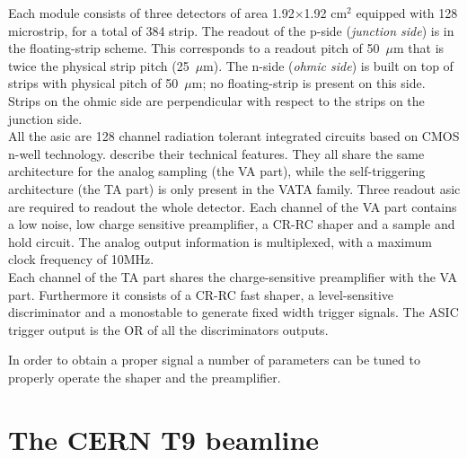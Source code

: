 Each module consists of three detectors of area 1.92$\times$1.92 cm$^2$
equipped with 128 microstrip, for a total of 384 strip. The readout of the
p-side ({\em junction side}) is in the floating-strip scheme. This corresponds
to a readout pitch of 50~$\mu$m that is twice the physical strip pitch
(25~$\mu$m). The n-side ({\em ohmic side}) is built on top of strips with physical pitch of
50~$\mu$m; no floating-strip is present on this side. Strips on the ohmic side
are perpendicular with respect to the strips on the junction side.\\

All the \gls{asic} are 128 channel radiation tolerant integrated circuits based
on CMOS n-well technology.  describe their technical
features. They all share the same architecture for the analog sampling (the VA
part), while the self-triggering architecture (the TA
part) is only present in the VATA family. Three readout \gls{asic} are required
to readout the whole detector.
Each channel of the VA part contains a low noise, low charge sensitive
preamplifier, a CR-RC shaper and a sample and hold circuit. The analog output
information is multiplexed, with a maximum clock frequency of 10MHz.\\
Each channel of the TA part shares the charge-sensitive preamplifier with the VA
part. Furthermore it consists of a CR-RC fast shaper, a level-sensitive discriminator
and a monostable to generate fixed width trigger signals. The ASIC trigger
output is the OR of all the discriminators outputs.
\begin{center}
\begin{table}
\caption{\it Technical features of the different ASICs }\label{tab:asics}
\end{table}
\end{center}
In order to obtain a proper signal a number of parameters can be tuned to
properly operate the shaper and the preamplifier.

\section{The CERN T9 beamline}\label{sec:T9}

